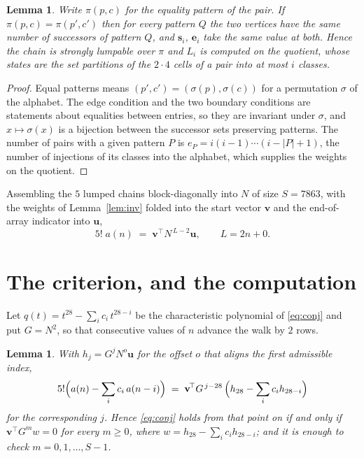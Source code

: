 \documentclass[11pt,a4paper]{article}
\theoremstyle{plain}
\newtheorem{lemma}[theorem]{Lemma}
\theoremstyle{definition}
\begin{document}
\begin{lemma}\label{lem:lump}
Write $\pi(p,c)$ for the equality pattern of the pair. If $\pi(p,c)=\pi(p',c')$ then for
every pattern $Q$ the two vertices have the same number of successors of pattern $Q$, and
$\mathbf{s}_i$, $\mathbf{e}_i$ take the same value at both. Hence the chain is strongly
lumpable over $\pi$ and $L_i$ is computed on the quotient, whose states are the set
partitions of the $2\cdot4$ cells of a pair into at most $i$ classes.
\end{lemma}

\begin{proof}
Equal patterns means $(p',c')=(\sigma(p),\sigma(c))$ for a permutation $\sigma$ of the
alphabet. The edge condition and the two boundary conditions are statements about equalities
between entries, so they are invariant under $\sigma$, and $x\mapsto\sigma(x)$ is a bijection
between the successor sets preserving patterns. The number of pairs with a given pattern $P$
is $e_P=i(i-1)\cdots(i-|P|+1)$, the number of injections of its classes into the alphabet,
which supplies the weights on the quotient.
\end{proof}

Assembling the $5$ lumped chains block-diagonally into $N$ of size $S=7863$, with the
weights of Lemma~\ref{lem:inv} folded into the start vector $\mathbf{v}$ and the
end-of-array indicator into $\mathbf{u}$,
\begin{equation}\label{eq:walk2}
5!\;a(n)\;=\;\mathbf{v}^{\!\top}N^{\,L-2}\mathbf{u},\qquad L=2n+0 .
\end{equation}

\section{The criterion, and the computation}

Let $q(t)=t^{28}-\sum_i c_i\,t^{28-i}$ be the characteristic polynomial of
\eqref{eq:conj} and put $G=N^{2}$, so that consecutive values of $n$ advance the
walk by $2$ rows.

\begin{lemma}\label{lem:crit}
With $h_j=G^{j}N^{o}\mathbf{u}$ for the offset $o$ that aligns the first admissible
index,
\[
5!\Bigl(a(n)-\sum_i c_i\,a(n-i)\Bigr)\;=\;\mathbf{v}^{\!\top}G^{\,j-28}\,
\Bigl(h_{28}-\sum_i c_i h_{28-i}\Bigr)
\]
for the corresponding $j$. Hence \eqref{eq:conj} holds from that point on if and only if
$\mathbf{v}^{\!\top}G^{m}w=0$ for every $m\ge0$, where
$w=h_{28}-\sum_i c_ih_{28-i}$; and it is enough to check $m=0,1,\dots,S-1$.
\end{lemma}
\end{document}
